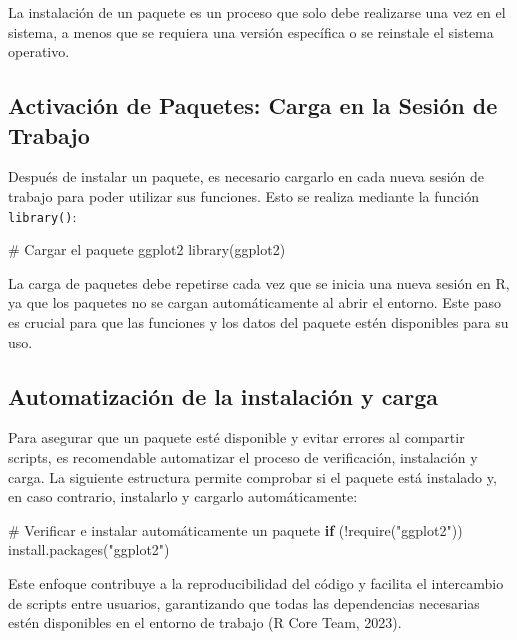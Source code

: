 \documentclass[
  spanish,
  a4paper,
  DIV=11,
  numbers=noendperiod,
  onepage,
  openany]{scrreprt}
\newenvironment{Shaded}{\begin{snugshade}}{\end{snugshade}}
\newcommand{\CommentTok}[1]{\textcolor[rgb]{0.37,0.37,0.37}{#1}}
\newcommand{\ControlFlowTok}[1]{\textcolor[rgb]{0.00,0.23,0.31}{\textbf{#1}}}
\newcommand{\FunctionTok}[1]{\textcolor[rgb]{0.28,0.35,0.67}{#1}}
\newcommand{\NormalTok}[1]{\textcolor[rgb]{0.00,0.23,0.31}{#1}}
\newcommand{\SpecialCharTok}[1]{\textcolor[rgb]{0.37,0.37,0.37}{#1}}
\newcommand{\StringTok}[1]{\textcolor[rgb]{0.13,0.47,0.30}{#1}}
\begin{document}
La instalación de un paquete es un proceso que solo debe realizarse una
vez en el sistema, a menos que se requiera una versión específica o se
reinstale el sistema operativo.

\subsection{Activación de Paquetes: Carga en la Sesión de
Trabajo}\label{activaciuxf3n-de-paquetes-carga-en-la-sesiuxf3n-de-trabajo}

Después de instalar un paquete, es necesario cargarlo en cada nueva
sesión de trabajo para poder utilizar sus funciones. Esto se realiza
mediante la función \texttt{library()}:

\begin{Shaded}
\begin{Highlighting}[]
\CommentTok{\# Cargar el paquete ggplot2}
\FunctionTok{library}\NormalTok{(ggplot2)}
\end{Highlighting}
\end{Shaded}

La carga de paquetes debe repetirse cada vez que se inicia una nueva
sesión en R, ya que los paquetes no se cargan automáticamente al abrir
el entorno. Este paso es crucial para que las funciones y los datos del
paquete estén disponibles para su uso.

\subsection{Automatización de la instalación y
carga}\label{automatizaciuxf3n-de-la-instalaciuxf3n-y-carga}

Para asegurar que un paquete esté disponible y evitar errores al
compartir scripts, es recomendable automatizar el proceso de
verificación, instalación y carga. La siguiente estructura permite
comprobar si el paquete está instalado y, en caso contrario, instalarlo
y cargarlo automáticamente:

\begin{Shaded}
\begin{Highlighting}[]
\CommentTok{\# Verificar e instalar automáticamente un paquete}
\ControlFlowTok{if}\NormalTok{ (}\SpecialCharTok{!}\FunctionTok{require}\NormalTok{(}\StringTok{"ggplot2"}\NormalTok{)) }\FunctionTok{install.packages}\NormalTok{(}\StringTok{"ggplot2"}\NormalTok{)}
\end{Highlighting}
\end{Shaded}

Este enfoque contribuye a la reproducibilidad del código y facilita el
intercambio de scripts entre usuarios, garantizando que todas las
dependencias necesarias estén disponibles en el entorno de trabajo (R
Core Team, 2023).
\end{document}
